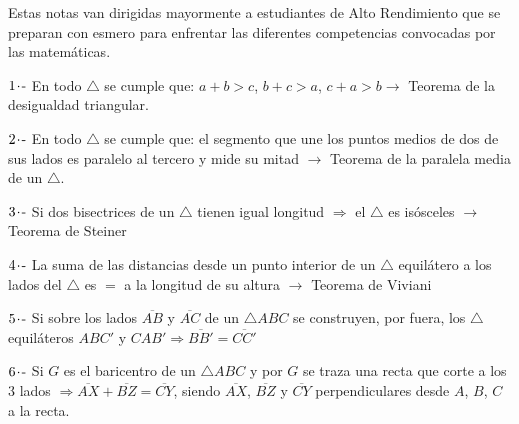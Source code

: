 Estas notas van dirigidas mayormente a estudiantes de Alto Rendimiento que se preparan con esmero para enfrentar las diferentes competencias convocadas por las matemáticas.

\vspace{0.5cm}

$1\hspace{-0.05cm}\cdot\hspace{-0.05cm}\text{-}$ En todo $\triangle$ se cumple que: $a+b>c$, $b+c>a$, $c+a>b \longrightarrow$ Teorema de la desigualdad triangular.

\vspace{0.5cm}

$2\hspace{-0.05cm}\cdot\hspace{-0.05cm}\text{-}$ En todo $\triangle$ se cumple que: el segmento que une los puntos medios de dos de sus lados es paralelo al tercero y mide su mitad $\longrightarrow$ Teorema de la paralela media de un $\triangle$.

\vspace{0.5cm}

$3\hspace{-0.05cm}\cdot\hspace{-0.05cm}\text{-}$ Si dos bisectrices de un $\triangle$ tienen igual longitud $\Longrightarrow$ el $\triangle$ es isósceles $\longrightarrow$ Teorema de Steiner

\vspace{0.5cm}

$4\hspace{-0.05cm}\cdot\hspace{-0.05cm}\text{-}$ La suma de las distancias desde un punto interior de un $\triangle$ equilátero a los lados del $\triangle$ es $=$ a la longitud de su altura $\longrightarrow$ Teorema de Viviani

\vspace{0.5cm}

$5\hspace{-0.05cm}\cdot\hspace{-0.05cm}\text{-}$ Si sobre los lados $\overline{AB}$ y $\overline{AC}$ de un $\triangle ABC$ se construyen, por fuera, los $\triangle$ equiláteros $ABC'$ y $CAB' \Longrightarrow \overline{BB'} = \overline{CC'}$

\vspace{0.5cm}

$6\hspace{-0.05cm}\cdot\hspace{-0.05cm}\text{-}$ Si $G$ es el baricentro de un $\triangle ABC$ y por $G$ se traza una recta que corte a los 3 lados $\Longrightarrow \overline{AX} + \overline{BZ} = \overline{CY}$, siendo $\overline{AX}$, $\overline{BZ}$ y $\overline{CY}$ perpendiculares desde $A$, $B$, $C$ a la recta.

